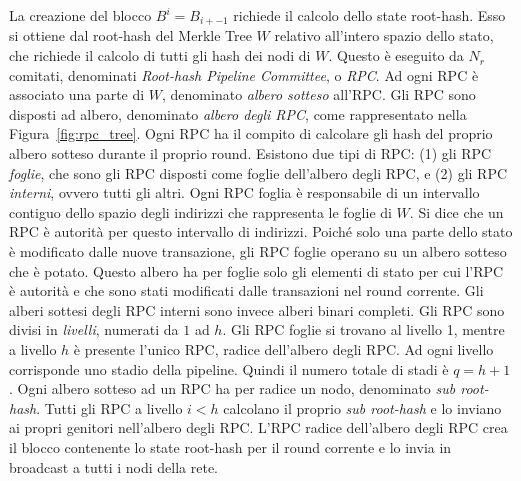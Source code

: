 La creazione del blocco $B^i = B_{i+-1}$ richiede il calcolo dello state root-hash. Esso si ottiene dal root-hash del Merkle Tree $W$ relativo all'intero spazio dello stato, che richiede il calcolo di tutti gli hash dei nodi di $W$.
Questo è eseguito da $N_r$ comitati, denominati \emph{Root-hash Pipeline Committee}, o \emph{RPC}. Ad ogni RPC è associato una parte di $W$, denominato \emph{albero sotteso} all'RPC. Gli RPC sono disposti ad albero, denominato \emph{albero degli RPC}, come rappresentato nella Figura~\ref{fig:rpc_tree}. Ogni RPC ha il compito di calcolare gli hash del proprio albero sotteso durante il proprio round. Esistono due tipi di RPC: (1) gli RPC \emph{foglie}, che sono gli RPC disposti come foglie dell'albero degli RPC, e (2) gli RPC \emph{interni}, ovvero tutti gli altri. Ogni RPC foglia è responsabile di un intervallo contiguo dello spazio degli indirizzi che rappresenta le foglie di $W$. Si dice che un RPC è autorità per questo intervallo di indirizzi. Poiché solo una parte dello stato è modificato dalle nuove transazione, gli RPC foglie operano su un albero sotteso che è potato. Questo albero ha per foglie solo gli elementi di stato per cui l'RPC è autorità e che sono stati modificati dalle transazioni nel round corrente. Gli alberi sottesi degli RPC interni sono invece alberi binari completi. Gli RPC sono divisi in \emph{livelli}, numerati da $1$ ad $h$. Gli RPC foglie si trovano al livello 1, mentre a livello $h$ è presente l'unico RPC, radice dell'albero degli RPC. Ad ogni livello corrisponde uno stadio della pipeline. Quindi il numero totale di stadi è $q = h+1$. Ogni albero sotteso ad un RPC ha per radice un nodo, denominato \emph{sub root-hash}. Tutti gli RPC a livello $i < h$ calcolano il proprio \emph{sub root-hash} e lo inviano ai propri genitori nell'albero degli RPC. L'RPC radice dell'albero degli RPC crea il blocco contenente lo state root-hash per il round corrente e lo invia in broadcast a tutti i nodi della rete.

